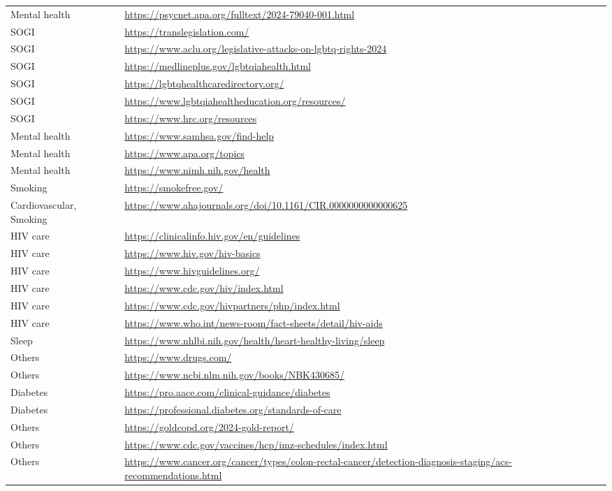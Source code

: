 \begin{table}[h]
{\begin{tabular}{ll}
Mental health & 	\url{https://psycnet.apa.org/fulltext/2024-79040-001.html} \\
SOGI & 	\url{https://translegislation.com/} \\
SOGI & 	\url{https://www.aclu.org/legislative-attacks-on-lgbtq-rights-2024} \\
SOGI & 	\url{https://medlineplus.gov/lgbtqiahealth.html} \\
SOGI & 	\url{https://lgbtqhealthcaredirectory.org/} \\
SOGI & 	\url{https://www.lgbtqiahealtheducation.org/resources/} \\
SOGI & 	\url{https://www.hrc.org/resources} \\
Mental health & 	\url{https://www.samhsa.gov/find-help} \\
Mental health & 	\url{https://www.apa.org/topics} \\
Mental health & 	\url{https://www.nimh.nih.gov/health} \\
Smoking & 	\url{https://smokefree.gov/} \\
Cardiovascular, Smoking & \url{https://www.ahajournals.org/doi/10.1161/CIR.0000000000000625} \\
HIV care & 	\url{https://clinicalinfo.hiv.gov/en/guidelines} \\
HIV care & 	\url{https://www.hiv.gov/hiv-basics} \\
HIV care & 	\url{https://www.hivguidelines.org/} \\
HIV care & 	\url{https://www.cdc.gov/hiv/index.html} \\
HIV care & 	\url{https://www.cdc.gov/hivpartners/php/index.html} \\
HIV care & 	\url{https://www.who.int/news-room/fact-sheets/detail/hiv-aids} \\
Sleep & 	\url{https://www.nhlbi.nih.gov/health/heart-healthy-living/sleep} \\
Others & 	\url{https://www.drugs.com/} \\
Others & 	\url{https://www.ncbi.nlm.nih.gov/books/NBK430685/} \\
Diabetes & 	\url{https://pro.aace.com/clinical-guidance/diabetes} \\
Diabetes & 	\url{https://professional.diabetes.org/standards-of-care} \\
Others & 	\url{https://goldcopd.org/2024-gold-report/} \\
Others & 	\url{https://www.cdc.gov/vaccines/hcp/imz-schedules/index.html} \\
Others & 	\url{https://www.cancer.org/cancer/types/colon-rectal-cancer/detection-diagnosis-staging/acs-recommendations.html} \\

\end{tabular}}
\end{table}
